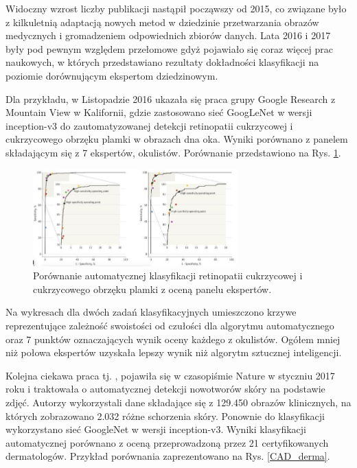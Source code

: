  Widoczny wzrost liczby publikacji nastąpił począwszy od 2015, co związane było z kilkuletnią adaptacją nowych metod w dziedzinie przetwarzania obrazów medycznych i gromadzeniem odpowiednich zbiorów danych. Lata 2016 i 2017 były pod pewnym względem przełomowe gdyż pojawiało się coraz więcej prac naukowych, w których przedstawiano rezultaty dokładności klasyfikacji na poziomie dorównującym ekspertom dziedzinowym.
 
 Dla przykładu, w Listopadzie 2016 ukazała się praca \cite{Gulshan2016} grupy Google Research z Mountain View w Kalifornii, gdzie zastosowano sieć GoogLeNet w wersji inception-v3 do zautomatyzowanej detekcji retinopatii cukrzycowej i cukrzycowego obrzęku plamki w obrazach dna oka. Wyniki porównano z panelem składającym się z 7 ekspertów, okulistów. Porównanie przedstawiono na Rys. \ref{CAD_opto}.
 \begin{figure}[h!]
 	\centering
 	\includegraphics[width=0.7\textwidth]{figures/CAD-okulisci.jpg}
 	\caption{Porównanie automatycznej klasyfikacji retinopatii cukrzycowej i cukrzycowego obrzęku plamki z oceną panelu ekspertów.}
 	\label{CAD_opto}
 \end{figure}
 
 Na wykresach dla dwóch zadań klasyfikacyjnych umieszczono krzywe reprezentujące zależność swoistości od czułości dla algorytmu automatycznego oraz 7 punktów oznaczających wynik oceny każdego z okulistów. Ogółem mniej niż połowa ekspertów uzyskała lepszy wynik niż algorytm sztucznej inteligencji.
 
 Kolejna ciekawa praca tj. \cite{Esteva2017}, pojawiła się w czasopiśmie Nature w styczniu 2017 roku i traktowała o automatycznej detekcji nowotworów skóry na podstawie zdjęć. Autorzy wykorzystali dane składające się z 129.450 obrazów klinicznych, na których zobrazowano 2.032 różne schorzenia skóry. Ponownie do klasyfikacji wykorzystano sieć GoogleNet w wersji inception-v3. Wyniki klasyfikacji automatycznej porównano z oceną przeprowadzoną przez 21 certyfikowanych dermatologów. Przykład porównania zaprezentowano na Rys. \ref{CAD_derma}. 
 
